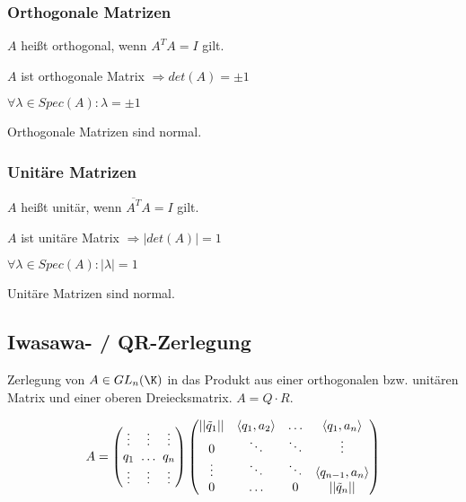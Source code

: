 \subsubsection*{Orthogonale Matrizen}

$A$ heißt orthogonal, wenn $A^TA=I$ gilt.

$A$ ist orthogonale Matrix $\Rightarrow det(A)=\pm 1$

$\forall \lambda \in Spec(A) : \lambda=\pm 1$

Orthogonale Matrizen sind normal.

\subsubsection*{Unitäre Matrizen}

$A$ heißt unitär, wenn $\overline{A^T}A = I$ gilt.

$A$ ist unitäre Matrix $\Rightarrow |det(A)|=1$

$\forall \lambda \in Spec(A) : |\lambda| = 1$

Unitäre Matrizen sind normal.

\subsection*{Iwasawa- / QR-Zerlegung}

Zerlegung von $A \in GL_n(\K)$ in das Produkt aus einer orthogonalen bzw. unitären Matrix und einer oberen Dreiecksmatrix. $A = Q \cdot R$.

\vspace*{-5mm}
\[ A = \begin{pmatrix}
\vdots & \vdots                           & \vdots \\
q_1    & \hspace{-3mm}\hdots\hspace{-3mm} & q_n \\
\vdots & \vdots                           & \vdots
\end{pmatrix}
\begin{pmatrix}
||\tilde q_1|| & \langle q_1, a_2 \rangle & \hdots & \langle q_1, a_n \rangle \\
0              & \ddots                   & \ddots & \vdots \\
\vdots         & \ddots                   & \ddots & \langle q_{n-1}, a_n \rangle \\
0              & \hdots                   & 0      & ||\tilde q_n||
\end{pmatrix} \]

